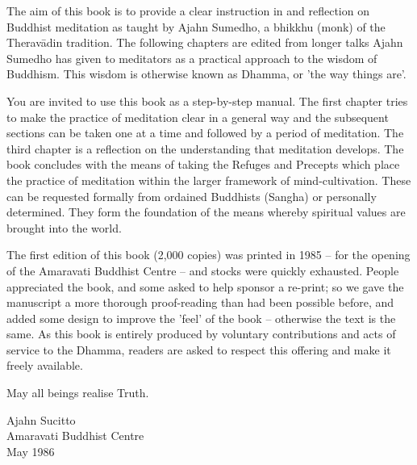 
The aim of this book is to provide a clear instruction in and reflection on Buddhist meditation as taught by Ajahn Sumedho, a bhikkhu (monk) of the Therav\=adin tradition. The following chapters are edited from longer talks Ajahn Sumedho has given to meditators as a practical approach to the wisdom of Buddhism. This wisdom is otherwise known as Dhamma, or 'the way things are'.

You are invited to use this book as a step-by-step manual. The first chapter tries to make the practice of meditation clear in a general way and the subsequent sections can be taken one at a time and followed by a period of meditation. The third chapter is a reflection on the understanding that meditation develops. The book concludes with the means of taking the Refuges and Precepts which place the practice of meditation within the larger framework of mind-cultivation. These can be requested formally from ordained Buddhists (Sangha) or personally determined. They form the foundation of the means whereby spiritual values are brought into the world.

The first edition of this book (2,000 copies) was printed in 1985 -- for the opening of the Amaravati Buddhist Centre -- and stocks were quickly exhausted. People appreciated the book, and some asked to help sponsor a re-print; so we gave the manuscript a more thorough proof-reading than had been possible before, and added some design to improve the 'feel' of the book -- otherwise the text is the same. As this book is entirely produced by voluntary contributions and acts of service to the Dhamma, readers are asked to respect this offering and make it freely available.

May all beings realise Truth.

\bigskip
{\par\raggedleft
Ajahn Sucitto\\
Amaravati Buddhist Centre\\
May 1986
\par}
